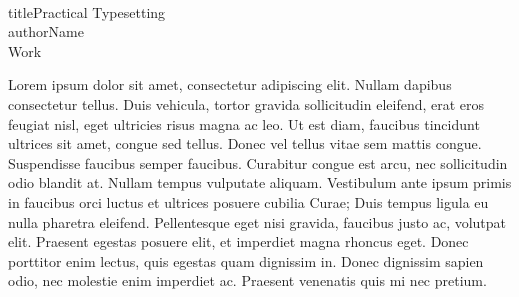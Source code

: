 \documentclass[11pt,a4paper,oneside]{report}
\begin{document}
\\title{\color{red}Practical Typesetting}
\\author{\color{blue}Name\\ Work}
\date{\color{green}December 2005}
\maketitle

Lorem ipsum dolor sit amet, consectetur adipiscing elit. Nullam dapibus consectetur tellus. Duis vehicula, tortor
gravida sollicitudin eleifend, erat eros feugiat nisl, eget ultricies risus magna ac leo. Ut est diam, faucibus
tincidunt ultrices sit amet, congue sed tellus. Donec vel tellus vitae sem mattis congue. Suspendisse faucibus
semper faucibus. Curabitur congue est arcu, nec sollicitudin odio blandit at. Nullam tempus vulputate aliquam.
Vestibulum ante ipsum primis in faucibus orci luctus et ultrices posuere cubilia Curae; Duis tempus ligula eu nulla
pharetra eleifend. Pellentesque eget nisi gravida, faucibus justo ac, volutpat elit. Praesent egestas posuere elit,
et imperdiet magna rhoncus eget. Donec porttitor enim lectus, quis egestas quam dignissim in. Donec dignissim sapien
odio, nec molestie enim imperdiet ac. Praesent venenatis quis mi nec pretium.
\end{document}
